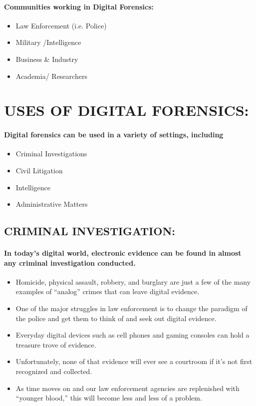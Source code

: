 \documentclass[10pt,british,english]{article}
\begin{document}
\paragraph{Communities working in Digital Forensics:}
\begin{itemize}
\item Law Enforcement (i.e. Police)
\item Military /Intelligence
\item Business \& Industry
\item Academia/ Researchers 
\end{itemize}

\section{USES OF DIGITAL FORENSICS:}

\paragraph*{Digital forensics can be used in a variety of settings, including}
\begin{itemize}
\item Criminal Investigations
\item Civil Litigation
\item Intelligence
\item Administrative Matters
\end{itemize}

\subsection{CRIMINAL INVESTIGATION:}

\paragraph{In today\textquoteright s digital world, electronic evidence can
be found in almost any criminal investigation conducted. }
\begin{itemize}
\item Homicide, physical assault, robbery, and burglary are just a few of
the many examples of \textquotedblleft analog\textquotedblright{}
crimes that can leave digital evidence.
\item One of the major struggles in law enforcement is to change the paradigm
of the police and get them to think of and seek out digital evidence. 
\item Everyday digital devices such as cell phones and gaming consoles can
hold a treasure trove of evidence. 
\item Unfortunately, none of that evidence will ever see a courtroom if
it\textquoteright s not first recognized and collected.
\item As time moves on and our law enforcement agencies are replenished
with \textquotedblleft younger blood,\textquotedblright{} this will
become less and less of a problem.
\end{itemize}
\end{document}

